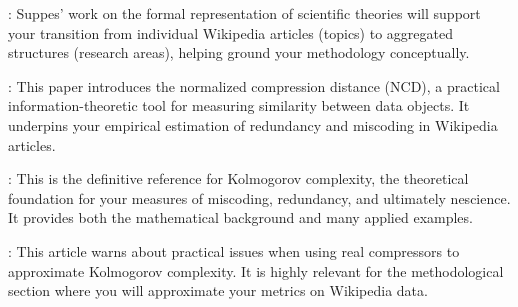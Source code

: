 \cite{suppes2002representation}: Suppes' work on the formal representation of scientific theories will support your transition from individual Wikipedia articles (topics) to aggregated structures (research areas), helping ground your methodology conceptually.

\cite{li2004similarity}: This paper introduces the normalized compression distance (NCD), a practical information-theoretic tool for measuring similarity between data objects. It underpins your empirical estimation of redundancy and miscoding in Wikipedia articles.

\cite{li2013introduction}: This is the definitive reference for Kolmogorov complexity, the theoretical foundation for your measures of miscoding, redundancy, and ultimately nescience. It provides both the mathematical background and many applied examples.

\cite{cebrian2005common}: This article warns about practical issues when using real compressors to approximate Kolmogorov complexity. It is highly relevant for the methodological section where you will approximate your metrics on Wikipedia data.




